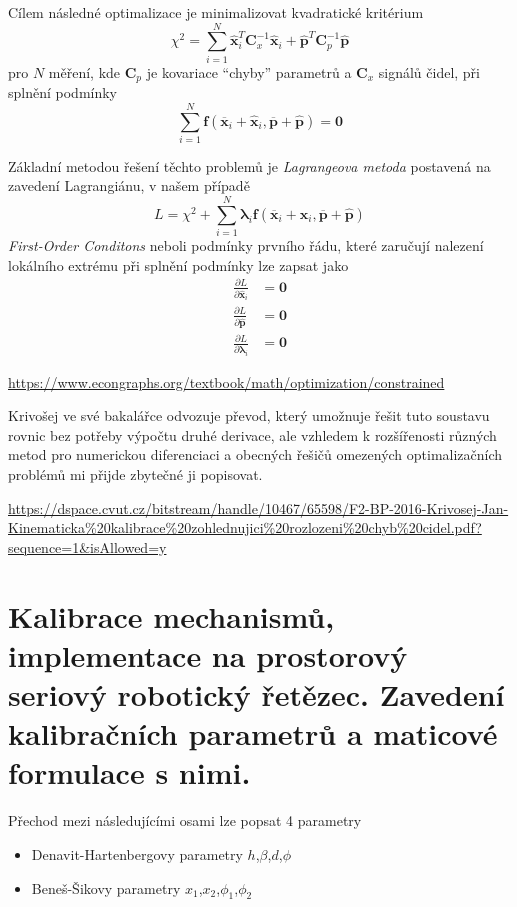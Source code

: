 \documentclass{article}
\begin{document}
	Cílem následné optimalizace je minimalizovat kvadratické kritérium
	\begin{equation}
	\chi^2 = \sum_{i=1}^N \bm{\hat{x}}_i^T \bm{C}_x^{-1} \bm{\hat{x}}_i + \bm{\hat{p}}^T \bm{C}_p^{-1} \bm{\hat{p}} 
	\end{equation}
	pro $N$ měření, kde $\bm{C}_p$ je kovariace ``chyby'' parametrů a $\bm{C}_x$ signálů čidel, při splnění podmínky
	\begin{equation}
		\sum_{i=1}^N \bm{f}(\bm{\overline{x}}_i+\bm{\hat{x}}_i,\bm{\overline{p}}+\bm{\hat{p}}) = \bm{0}
	\end{equation}

	Základní metodou řešení těchto problemů je \emph{Lagrangeova metoda} postavená na zavedení Lagrangiánu, v našem případě
	\begin{equation}
		L = \chi^2 + \sum_{i=1}^N \bm{\lambda}_i \bm{f}(\bm{\overline{x}}_i+\bm{\hat{x}}_i,\bm{\overline{p}}+\bm{\hat{p}})
	\end{equation}
	\emph{First-Order Conditons} neboli podmínky prvního řádu, které zaručují nalezení lokálního extrému při splnění podmínky lze zapsat jako
	\begin{align}
		\frac{\partial L}{\partial \bm{\hat{x}}_i} &= \bm{0} \\
		\frac{\partial L}{\partial \bm{\hat{p}}} &= \bm{0} \\
		\frac{\partial L}{\partial \bm{\lambda}_i} &= \bm{0}
	\end{align}

	\url{https://www.econgraphs.org/textbook/math/optimization/constrained}
	
	Krivošej ve své bakalářce odvozuje převod, který umožnuje řešit tuto soustavu rovnic bez potřeby výpočtu druhé derivace, ale vzhledem k rozšířenosti různých metod pro numerickou diferenciaci a obecných řešičů omezených optimalizačních problémů mi přijde zbytečné ji popisovat.

	\url{https://dspace.cvut.cz/bitstream/handle/10467/65598/F2-BP-2016-Krivosej-Jan-Kinematicka%20kalibrace%20zohlednujici%20rozlozeni%20chyb%20cidel.pdf?sequence=1&isAllowed=y}

	\section{Kalibrace mechanismů, implementace na prostorový seriový robotický řetězec. Zavedení kalibračních parametrů a maticové formulace s nimi.}

	Přechod mezi následujícími osami lze popsat 4 parametry
	\begin{itemize}
		\item Denavit-Hartenbergovy parametry $h$,$\beta$,$d$,$\phi$
		\item Beneš-Šikovy parametry $x_1$,$x_2$,$\phi_1$,$\phi_2$
	\end{itemize}
\end{document}
